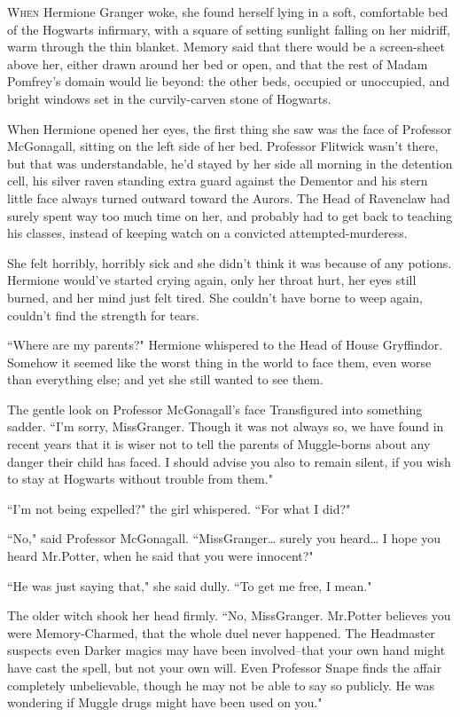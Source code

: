 
\lettrine{W}{hen} Hermione Granger woke, she found herself lying in a soft, comfortable bed of the Hogwarts infirmary, with a square of setting sunlight falling on her midriff, warm through the thin blanket. Memory said that there would be a screen-sheet above her, either drawn around her bed or open, and that the rest of Madam Pomfrey's domain would lie beyond: the other beds, occupied or unoccupied, and bright windows set in the curvily-carven stone of Hogwarts.

When Hermione opened her eyes, the first thing she saw was the face of Professor McGonagall, sitting on the left side of her bed. Professor Flitwick wasn't there, but that was understandable, he'd stayed by her side all morning in the detention cell, his silver raven standing extra guard against the Dementor and his stern little face always turned outward toward the Aurors. The Head of Ravenclaw had surely spent way too much time on her, and probably had to get back to teaching his classes, instead of keeping watch on a convicted attempted-murderess.

She felt horribly, horribly sick and she didn't think it was because of any potions. Hermione would've started crying again, only her throat hurt, her eyes still burned, and her mind just felt tired. She couldn't have borne to weep again, couldn't find the strength for tears.

``Where are my parents?" Hermione whispered to the Head of House Gryffindor. Somehow it seemed like the worst thing in the world to face them, even worse than everything else; and yet she still wanted to see them.

The gentle look on Professor McGonagall's face Transfigured into something sadder. ``I'm sorry, Miss\?Granger. Though it was not always so, we have found in recent years that it is wiser not to tell the parents of Muggle-borns about any danger their child has faced. I should advise you also to remain silent, if you wish to stay at Hogwarts without trouble from them."

``I'm not being expelled?" the girl whispered. ``For what I did?"

``No," said Professor McGonagall. ``Miss\?Granger{\ldots} surely you heard{\ldots} I hope you heard Mr.\?Potter, when he said that you were innocent?"

``He was just saying that," she said dully. ``To get me free, I mean."

The older witch shook her head firmly. ``No, Miss\?Granger. Mr.\?Potter believes you were Memory-Charmed, that the whole duel never happened. The Headmaster suspects even Darker magics may have been involved\---that your own hand might have cast the spell, but not your own will. Even Professor Snape finds the affair completely unbelievable, though he may not be able to say so publicly. He was wondering if Muggle drugs might have been used on you."

